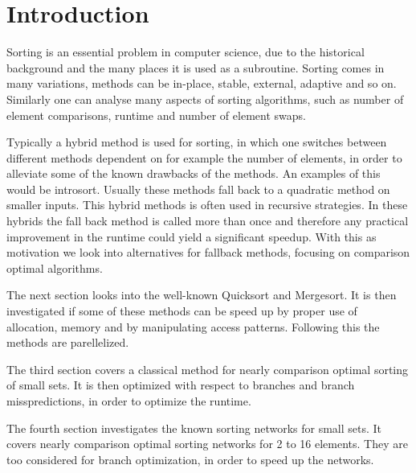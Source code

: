 \section{Introduction}
Sorting is an essential problem in computer science, due to the historical background and the many places it is used as a subroutine. Sorting comes in many variations, methods can be in-place, stable, external, adaptive and so on. Similarly one can analyse many aspects of sorting algorithms, such as number of element comparisons, runtime and number of element swaps.

Typically a hybrid method is used for sorting, in which one switches between different methods dependent on for example the number of elements, in order to alleviate some of the known drawbacks of the methods. An examples of this would be introsort\cite{m97}. Usually these methods fall back to a quadratic method on smaller inputs. This hybrid methods is often used in recursive strategies. In these hybrids the fall back method is called more than once and therefore any practical improvement in the runtime could yield a significant speedup. With this as motivation we look into alternatives for fallback methods, focusing on comparison optimal algorithms.


The next section looks into the well-known Quicksort and Mergesort. It is then investigated if some of these methods can be speed up by proper use of allocation, memory and by manipulating access patterns. Following this the methods are parellelized.

The third section covers a classical method for nearly comparison optimal sorting of small sets. It is then optimized with respect to branches and branch misspredictions, in order to optimize the runtime.

The fourth section investigates the known sorting networks for small sets. It covers nearly comparison optimal sorting networks for 2 to 16 elements. They are too considered for branch optimization, in order to speed up the networks.

